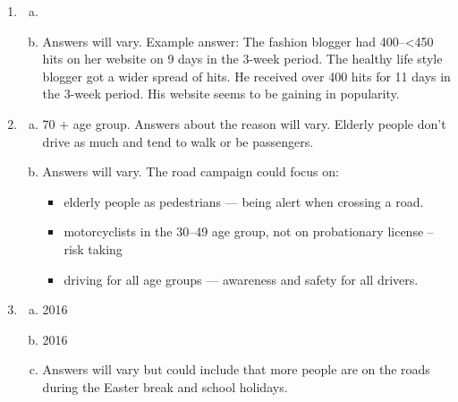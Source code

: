 \documentclass{article}
\begin{document}
\begin{enumerate}
\begin{enumerate}[(a)]
    \item  23
\end{enumerate}
\item 
\begin{enumerate}[(a)]
    \item  
\item  Answers will vary. Example answer:
The fashion blogger had 400–<450 hits on her website on 9 days in the 3-week period. The healthy life style blogger got a
wider spread of hits. He received over 400 hits for 11 days in the 3-week period. His website seems to be gaining in
popularity.  
\end{enumerate}
\item 
\begin{enumerate}[(a)]
    \item 70 + age group. Answers about the reason will vary. Elderly people don’t drive as much and tend to walk or be passengers. 
    \item Answers will vary. The road campaign could focus on:
\begin{itemize}
    \item elderly people as pedestrians — being alert when crossing a road.
\item motorcyclists in the 30–49 age group, not on probationary license -- risk taking
\item driving for all age groups — awareness and safety for all drivers. 
\end{itemize}
\end{enumerate}
\item 
\begin{enumerate}[(a)]
    \item 2016
   \item 2016
   \item Answers will vary but could include that more people are on the roads during the Easter break and school holidays. 
\end{enumerate}
\end{enumerate}
\end{document}
